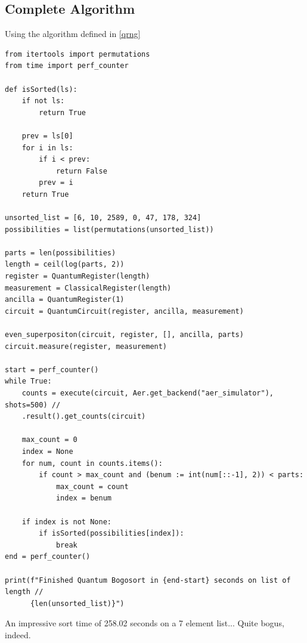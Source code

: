 \documentclass[12pt]{article}
\begin{document}
\subsection{Complete Algorithm}
Using the algorithm defined in \ref{qrng}
\begin{verbatim}
from itertools import permutations
from time import perf_counter

def isSorted(ls):
    if not ls:
        return True

    prev = ls[0]
    for i in ls:
        if i < prev:
            return False
        prev = i
    return True

unsorted_list = [6, 10, 2589, 0, 47, 178, 324]
possibilities = list(permutations(unsorted_list))

parts = len(possibilities)
length = ceil(log(parts, 2))
register = QuantumRegister(length)
measurement = ClassicalRegister(length)
ancilla = QuantumRegister(1)
circuit = QuantumCircuit(register, ancilla, measurement)

even_superpositon(circuit, register, [], ancilla, parts)
circuit.measure(register, measurement)

start = perf_counter()
while True:
    counts = execute(circuit, Aer.get_backend("aer_simulator"), shots=500) //
    .result().get_counts(circuit)

    max_count = 0
    index = None
    for num, count in counts.items():
        if count > max_count and (benum := int(num[::-1], 2)) < parts:
            max_count = count
            index = benum

    if index is not None:
        if isSorted(possibilities[index]):
            break
end = perf_counter()

print(f"Finished Quantum Bogosort in {end-start} seconds on list of length //
      {len(unsorted_list)}")
\end{verbatim}
An impressive sort time of 258.02 seconds on a 7 element list... Quite bogus, indeed.
\end{document}
